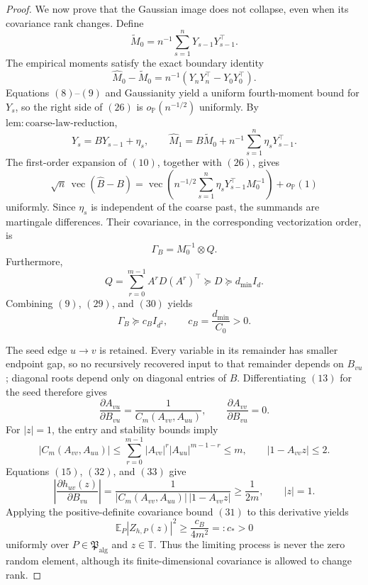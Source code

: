 \documentclass{article}
\begin{document}
\begin{proof}
We now prove that the Gaussian image does not collapse, even when its covariance rank changes.  Define
\[
 \widetilde M_0=n^{-1}\sum_{s=1}^{n}Y_{s-1}Y_{s-1}^\top.
\]
The empirical moments satisfy the exact boundary identity
\[
 \widehat M_0-\widetilde M_0
 =n^{-1}(Y_nY_n^\top-Y_0Y_0^\top).
\tag{26}
\]
Equations \((8)\)--\((9)\) and Gaussianity yield a uniform fourth-moment bound for \(Y_s\), so the right side of \((26)\) is \(o_{\mathbb P}(n^{-1/2})\) uniformly.  By \(\mathrm{lem{:}coarse\mbox{-}law\mbox{-}reduction}\),
\[
 Y_s=BY_{s-1}+\eta_s,
 \qquad
 \widehat M_1
 =B\widetilde M_0+n^{-1}\sum_{s=1}^{n}\eta_sY_{s-1}^\top.
\tag{27}
\]
The first-order expansion of \((10)\), together with \((26)\), gives
\[
 \sqrt n\,\operatorname{vec}(\widehat B-B)
 =\operatorname{vec}\!\left(
 n^{-1/2}\sum_{s=1}^{n}\eta_sY_{s-1}^\top M_0^{-1}
 \right)+o_{\mathbb P}(1)
\tag{28}
\]
uniformly.  Since \(\eta_s\) is independent of the coarse past, the summands are martingale differences.  Their covariance, in the corresponding vectorization order, is
\[
 \Gamma_B=M_0^{-1}\otimes Q.
\tag{29}
\]
Furthermore,
\[
 Q=\sum_{r=0}^{m-1}A^rD(A^r)^\top\succeq D\succeq d_{\min}I_d.
\tag{30}
\]
Combining \((9)\), \((29)\), and \((30)\) yields
\[
 \Gamma_B\succeq c_BI_{d^2},
 \qquad c_B=\frac{d_{\min}}{C_0}>0.
\tag{31}
\]

The seed edge \(u\to v\) is retained.  Every variable in its remainder has smaller endpoint gap, so no recursively recovered input to that remainder depends on \(B_{vu}\); diagonal roots depend only on diagonal entries of \(B\).  Differentiating \((13)\) for the seed therefore gives
\[
 \frac{\partial A_{vu}}{\partial B_{vu}}
 =\frac{1}{C_m(A_{vv},A_{uu})},
 \qquad
 \frac{\partial A_{vv}}{\partial B_{vu}}=0.
\tag{32}
\]
For \(|z|=1\), the entry and stability bounds imply
\[
 |C_m(A_{vv},A_{uu})|
 \le\sum_{r=0}^{m-1}|A_{vv}|^r|A_{uu}|^{m-1-r}\le m,
 \qquad
 |1-A_{vv}z|\le2.
\tag{33}
\]
Equations \((15)\), \((32)\), and \((33)\) give
\[
 \left|\frac{\partial h_{uv}(z)}{\partial B_{vu}}\right|
 =\frac{1}{|C_m(A_{vv},A_{uu})|\,|1-A_{vv}z|}
 \ge\frac{1}{2m},
 \qquad |z|=1.
\tag{34}
\]
Applying the positive-definite covariance bound \((31)\) to this derivative yields
\[
 \mathbb E_P|Z_{h,P}(z)|^2
 \ge\frac{c_B}{4m^2}=:c_*>0
\tag{35}
\]
uniformly over \(P\in\mathfrak P_{\mathrm{alg}}\) and \(z\in\mathbb T\).  Thus the limiting process is never the zero random element, although its finite-dimensional covariance is allowed to change rank.


\end{proof}
\end{document}
